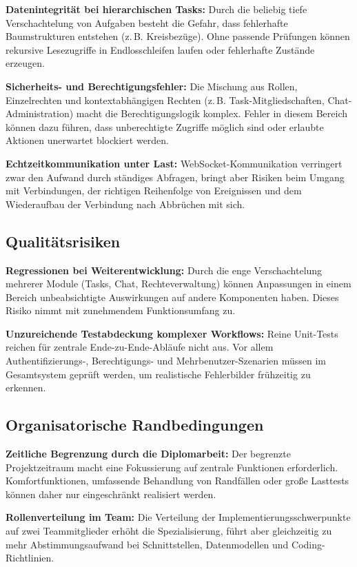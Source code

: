 \textbf{Datenintegrität bei hierarchischen Tasks:}
Durch die beliebig tiefe Verschachtelung von Aufgaben besteht die Gefahr, dass fehlerhafte Baumstrukturen entstehen (z.\,B. Kreisbezüge). Ohne passende Prüfungen können rekursive Lesezugriffe in Endlosschleifen laufen oder fehlerhafte Zustände erzeugen.
 
\textbf{Sicherheits- und Berechtigungsfehler:}
Die Mischung aus Rollen, Einzelrechten und kontextabhängigen Rechten (z.\,B. Task-Mitgliedschaften, Chat-Administration) macht die Berechtigungslogik komplex. Fehler in diesem Bereich können dazu führen, dass unberechtigte Zugriffe möglich sind oder erlaubte Aktionen unerwartet blockiert werden.
 
\textbf{Echtzeitkommunikation unter Last:}
WebSocket-Kommunikation verringert zwar den Aufwand durch ständiges Abfragen, bringt aber Risiken beim Umgang mit Verbindungen, der richtigen Reihenfolge von Ereignissen und dem Wiederaufbau der Verbindung nach Abbrüchen mit sich.
\subsection{Qualitätsrisiken}
\textbf{Regressionen bei Weiterentwicklung:}
Durch die enge Verschachtelung mehrerer Module (Tasks, Chat, Rechteverwaltung) können Anpassungen in einem Bereich unbeabsichtigte Auswirkungen auf andere Komponenten haben. Dieses Risiko nimmt mit zunehmendem Funktionsumfang zu.
 
\textbf{Unzureichende Testabdeckung komplexer Workflows:}
Reine Unit-Tests reichen für zentrale Ende-zu-Ende-Abläufe nicht aus. Vor allem Authentifizierungs-, Berechtigungs- und Mehrbenutzer-Szenarien müssen im Gesamtsystem geprüft werden, um realistische Fehlerbilder frühzeitig zu erkennen.
 
\subsection{Organisatorische Randbedingungen}
\textbf{Zeitliche Begrenzung durch die Diplomarbeit:}
Der begrenzte Projektzeitraum macht eine Fokussierung auf zentrale Funktionen erforderlich. Komfortfunktionen, umfassende Behandlung von Randfällen oder große Lasttests können daher nur eingeschränkt realisiert werden.
 
\textbf{Rollenverteilung im Team:}
Die Verteilung der Implementierungsschwerpunkte auf zwei Teammitglieder erhöht die Spezialisierung, führt aber gleichzeitig zu mehr Abstimmungsaufwand bei Schnittstellen, Datenmodellen und Coding-Richtlinien.
 
